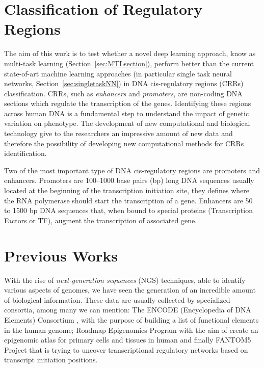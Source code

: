 \section{Classification of Regulatory Regions}
The aim of this work is to test whether a novel deep learning approach,
know as multi-task learning (Section~\ref{sec:MTLsection}), perform better than the current state-of-art
machine learning approaches (in particular single task neural networks, Section~\ref{sec:singletaskNN}) in
DNA cis-regulatory regions (CRRs) classification. CRRs, such as
\emph{enhancers} and \emph{promoters}, are non-coding DNA sections which
regulate the transcription of the genes. Identifying these regions across
human DNA is a fundamental step to understand the impact of genetic
variation on phenotype. The development of new computational and
biological technology give to the researchers an impressive amount of new
data and therefore the possibility of developing new computational methods
for CRRs identification.

Two of the most important type of DNA cis-regulatory regions are promoters
and enhancers. Promoters are 100–1000 base pairs (bp) long DNA sequences
usually located at the beginning of the transcription initiation site,
they defines where the RNA polymerase should start the transcription of a
gene. Enhancers are 50 to 1500 bp DNA sequences that, when bound to
special proteins (Transcription Factors or TF), augment the transcription
of associated gene.

\section{Previous Works}
With the rise of \emph{next-generation sequences} (NGS) techniques, able
to identify various aspects of genomes, we have seen the generation of an
incredible amount of biological information. These data are usually
collected by specialized consortia, among many we can mention: The ENCODE
(Encyclopedia of DNA Elements) Consortium \cite{ENCODE_data}, with the purpose of building a list of functional elements in the human genome; Roadmap Epigenomics Program \cite{ROADMAP} with the aim of create an epigenomic atlas for primary cells and tissues in human and finally FANTOM5 Project \cite{FANTOM_data} that is trying to uncover transcriptional regulatory networks based on transcript initiation positions.

